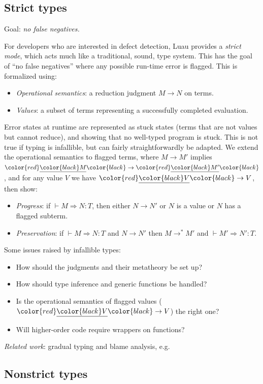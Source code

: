 \documentclass[acmsmall]{acmart}
\newcommand{\squnder}[1]{\color{red}\underline{{\color{black}#1}}\color{black}}
\begin{document}
\subsection{Strict types}

Goal: \emph{no false negatives.}

For developers who are interested in defect detection, Luau provides a \emph{strict mode},
which acts much like a traditional, sound, type system. This has the goal of ``no false negatives''
where any possible run-time error is flagged. This is formalized using:
\begin{itemize}
\item \emph{Operational semantics}: a reduction judgment $M \rightarrow N$ on terms.
\item \emph{Values}: a subset of terms representing a successfully completed evaluation.
\end{itemize}
Error states at runtime are represented as stuck states (terms that are not
values but cannot reduce), and showing that no well-typed program is
stuck. This is not true if typing is infallible, but can fairly
straightforwardly be adapted. We extend the operational semantics to flagged terms,
where $M \rightarrow M'$ implies $\squnder{M} \rightarrow \squnder{M'}$, and
for any value $V$ we have $\squnder{V} \rightarrow V$, then show:
\begin{itemize}
\item \emph{Progress}: if ${} \vdash M \Rightarrow N : T$, then either $N \rightarrow N'$ or $N$ is a value or $N$ has a flagged subterm.
\item \emph{Preservation}: if ${} \vdash M \Rightarrow N : T$ and $N \rightarrow N'$ then  $M \rightarrow^*M'$ and ${} \vdash M' \Rightarrow N' : T$.
\end{itemize}
Some issues raised by infallible types:
\begin{itemize}
\item How should the judgments and their metatheory be set up?
\item How should type inference and generic functions be handled?
\item Is the operational semantics of flagged values
  ($\squnder{V} \rightarrow V$) the right one?
\item Will higher-order code require wrappers on functions? 
\end{itemize}
\emph{Related work}: gradual typing and blame analysis, e.g.~\cite{GradualTyping,WellTyped,Contracts}

\subsection{Nonstrict types}
\end{document}
